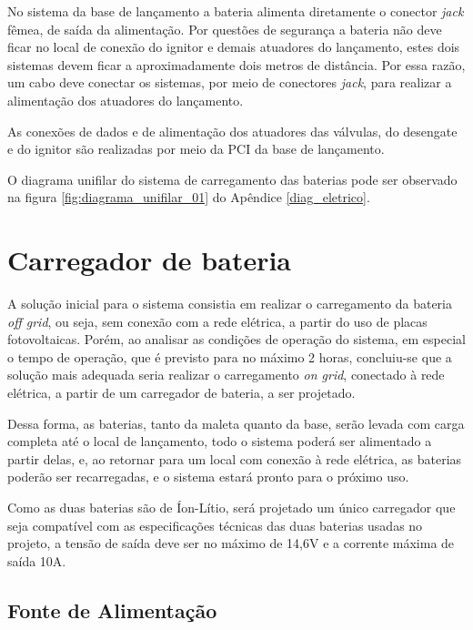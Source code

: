 \par No sistema da base de lançamento a bateria alimenta diretamente o conector \textit{jack} fêmea, de saída da alimentação. Por questões de segurança a bateria não deve ficar no local de conexão do ignitor e demais atuadores do lançamento, estes dois sistemas devem ficar a aproximadamente dois metros de distância. Por essa razão, um cabo deve conectar os sistemas, por meio de conectores \textit{jack}, para realizar a alimentação dos atuadores do lançamento.

\par As conexões de dados e de alimentação dos atuadores das válvulas, do desengate e do ignitor são realizadas por meio da PCI da base de lançamento.

\par O diagrama unifilar do sistema de carregamento das baterias pode ser observado na figura \ref{fig:diagrama_unifilar_01} do Apêndice \ref{diag_eletrico}.

\section{Carregador de bateria}
\label{sec:carregador}

\par A solução inicial para o sistema consistia em realizar o carregamento da bateria \textit{off grid}, ou seja, sem conexão com a rede elétrica, a partir do uso de placas fotovoltaicas. Porém, ao analisar as condições de operação do sistema, em especial o tempo de operação, que é previsto para no máximo 2 horas, concluiu-se que a solução mais adequada seria realizar o carregamento \textit{on grid}, conectado à rede elétrica, a partir de um carregador de bateria, a ser projetado.

\par Dessa forma, as baterias, tanto da maleta quanto da base, serão levada com carga completa até o local de lançamento, todo o sistema poderá ser alimentado a partir delas, e, ao retornar para um local com conexão à rede elétrica, as baterias poderão ser recarregadas, e o sistema estará pronto para o próximo uso.

\par Como as duas baterias são de Íon-Lítio, será projetado um único carregador que seja compatível com as especificações técnicas das duas baterias usadas no projeto, a tensão de saída deve ser no máximo de 14,6V e a corrente máxima de saída 10A.

\subsection{Fonte de Alimentação}

